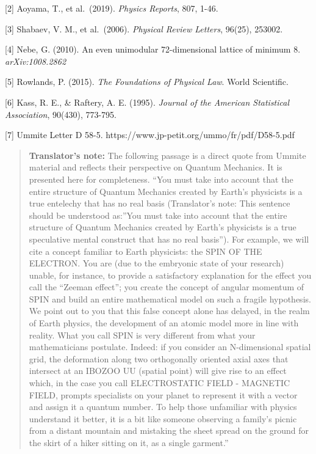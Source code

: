 \documentclass[11pt]{article}
\begin{document}
{[}2{]} Aoyama, T., et al.~(2019). \emph{Physics Reports}, 807, 1-46.

{[}3{]} Shabaev, V. M., et al.~(2006). \emph{Physical Review Letters},
96(25), 253002.

{[}4{]} Nebe, G. (2010). An even unimodular 72-dimensional lattice of
minimum 8. \emph{arXiv:1008.2862}

{[}5{]} Rowlands, P. (2015). \emph{The Foundations of Physical Law}.
World Scientific.

{[}6{]} Kass, R. E., \& Raftery, A. E. (1995). \emph{Journal of the
American Statistical Association}, 90(430), 773-795.

{[}7{]} Ummite Letter D 58-5.
https://www.jp-petit.org/ummo/fr/pdf/D58-5.pdf

\begin{quote}
\textbf{Translator's note:} The following passage is a direct quote from
Ummite material and reflects their perspective on Quantum Mechanics. It
is presented here for completeness. ``You must take into account that
the entire structure of Quantum Mechanics created by Earth's physicists
is a true entelechy that has no real basis (Translator's note: This
sentence should be understood as:''You must take into account that the
entire structure of Quantum Mechanics created by Earth's physicists is a
true speculative mental construct that has no real basis''). For
example, we will cite a concept familiar to Earth physicists: the SPIN
OF THE ELECTRON. You are (due to the embryonic state of your research)
unable, for instance, to provide a satisfactory explanation for the
effect you call the ``Zeeman effect''; you create the concept of angular
momentum of SPIN and build an entire mathematical model on such a
fragile hypothesis. We point out to you that this false concept alone
has delayed, in the realm of Earth physics, the development of an atomic
model more in line with reality. What you call SPIN is very different
from what your mathematicians postulate. Indeed: if you consider an
N-dimensional spatial grid, the deformation along two orthogonally
oriented axial axes that intersect at an IBOZOO UU (spatial point) will
give rise to an effect which, in the case you call ELECTROSTATIC FIELD -
MAGNETIC FIELD, prompts specialists on your planet to represent it with
a vector and assign it a quantum number. To help those unfamiliar with
physics understand it better, it is a bit like someone observing a
family's picnic from a distant mountain and mistaking the sheet spread
on the ground for the skirt of a hiker sitting on it, as a single
garment.''
\end{quote}
\end{document}
